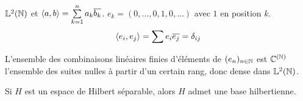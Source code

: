 \begin{example}
	$\mathbb{L}^2(\mathbb{N})$  et $\left\langle a, b \right\rangle = \sum\limits_{k=1}^n a_k \overline{b_k}$.
	$e_k = (0, \ldots, 0, 1, 0, \ldots)$ avec $1$ en position $k$.
	$$ \left\langle e_i, e_j \right\rangle = \sum e_i \overline{e_j} = \delta_{ij} $$

	L'ensemble des combinaisons linéaires finies d'éléments de $(e_n)_{n\in \mathbb{N}}$ est $\mathbb{C}^{(\mathbb{N})}$ l'ensemble des suites nulles à partir d'un certain rang, donc dense dans $\mathbb{L}^2(\mathbb{N})$.
\end{example}

\begin{example}
\end{example}


\begin{theorem}
	Si $H$ est un espace de Hilbert séparable, alors $H$ admet une base hilbertienne.
\end{theorem}

